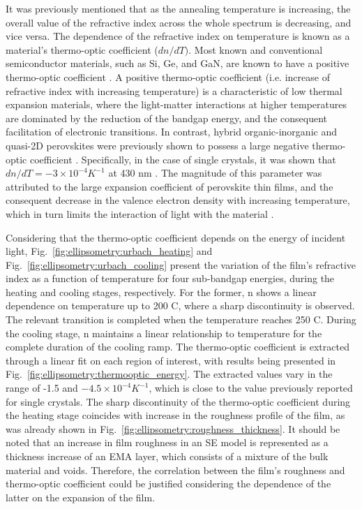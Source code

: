 It was previously mentioned that as the annealing temperature is increasing, the overall value of the refractive index across the whole spectrum is decreasing, and vice versa. The dependence of the refractive index on temperature is known as a material's thermo-optic coefficient ($dn/dT)$.  Most known and conventional semiconductor materials, such as Si, Ge, and GaN, are known to have a positive thermo-optic coefficient \cite{Fujiwara2018SpectroscopicCharacterization, Komma2012Thermo-opticTemperatures, Rao2022Temperature1550nm}. A positive thermo-optic coefficient  (i.e. increase of refractive index with increasing temperature) is a characteristic of low thermal expansion materials, where the light-matter interactions at higher temperatures are dominated by the reduction of the bandgap energy, and the consequent facilitation of electronic transitions. In contrast, hybrid organic-inorganic and quasi-2D perovskites were previously shown to possess a large negative thermo-optic coefficient \cite{Handa2019LargePerovskite, Wu2023CarrierPhononPerovskite}. Specifically, in the case of  single crystals, it was shown that $dn/dT = -3\times 10^{-4} K^{-1}$ at 430 nm \cite{Handa2019LargePerovskite}. The magnitude of this parameter was attributed to the large expansion coefficient of perovskite thin films, and the consequent decrease in the valence electron density with increasing temperature, which in turn limits the interaction of light with the material \cite{Handa2020LargeCHsub4/subNHsub3/subPbClsub3/sub}. 

Considering that the thermo-optic coefficient depends on the energy of incident light, Fig.~\ref{fig:ellipsometry:urbach_heating} and Fig.~\ref{fig:ellipsometry:urbach_cooling} present the variation of the film's refractive index as a function of temperature for four sub-bandgap energies, during the heating and cooling stages, respectively. For the former, n shows a linear dependence on temperature up to 200 \degree C, where a sharp discontinuity is observed. The relevant transition is completed when the temperature reaches 250 \degree C. During the cooling stage, n maintains a linear relationship to temperature for the complete duration of the cooling ramp. The thermo-optic coefficient is extracted through a linear fit on each region of interest, with results being presented in Fig.~\ref{fig:ellipsometry:thermooptic_energy}. The extracted values vary in the range of -1.5 and $-4.5\times 10^{-4} K^{-1}$, which is close to the value previously reported for  single crystals. The sharp discontinuity of the thermo-optic coefficient during the heating stage coincides with increase in the roughness profile of the film, as was already shown in Fig.~\ref{fig:ellipsometry:roughness_thickness}. It should be noted that an increase in film roughness in an SE model is represented as a thickness increase of an EMA layer, which consists of a mixture of the bulk material and voids. Therefore, the correlation between the film's roughness and thermo-optic coefficient could be justified considering the dependence of the latter on the expansion of the film.


